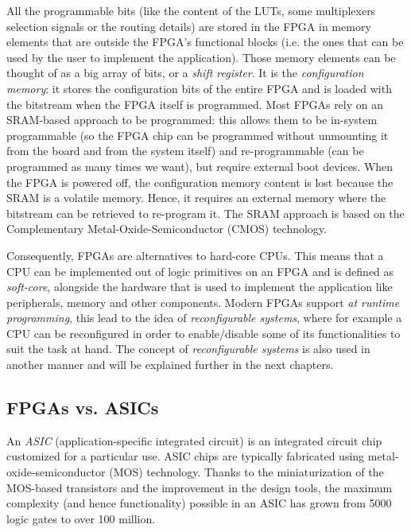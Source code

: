 All the programmable bits (like the content of the LUTs, some multiplexers selection signals or the routing details) are stored in the FPGA in memory elements that are outside the FPGA's functional blocks (i.e. the ones that can be used by the user to implement the application). Those memory elements can be thought of as a big array of bits, or a \textit{shift register}. It is the \textit{configuration memory}: it stores the configuration bits of the entire FPGA and is loaded with the bitstream when the FPGA itself is programmed. Most FPGAs rely on an SRAM-based approach to be programmed: this allows them to be in-system programmable (so the FPGA chip can be programmed without unmounting it from the board and from the system itself) and re-programmable (can be programmed as many times we want), but require external boot devices. When the FPGA is powered off, the configuration memory content is lost because the SRAM is a volatile memory. Hence, it requires an external memory where the bitstream can be retrieved to re-program it. The SRAM approach is based on the Complementary Metal-Oxide-Semiconductor (CMOS) technology.\bigskip

Consequently, FPGAs are alternatives to hard-core CPUs. This means that a CPU can be implemented out of logic primitives on an FPGA and is defined as \textit{soft-core}, alongside the hardware that is used to implement the application like peripherals, memory and other components. Modern FPGAs support \textit{at runtime programming}, this lead to the idea of \textit{reconfigurable systems}, where for example a CPU can be reconfigured in order to enable/disable some of its functionalities to suit the task at hand. The concept of \textit{reconfigurable systems} is also used in another manner and will be explained further in the next chapters.

\subsection{FPGAs vs. ASICs}

An \textit{ASIC} (application-specific integrated circuit) is an integrated circuit chip customized for a particular use. ASIC chips are typically fabricated using metal-oxide-semiconductor (MOS) technology. Thanks to the miniaturization of the MOS-based transistors and the improvement in the design tools, the maximum complexity (and hence functionality) possible in an ASIC has grown from 5000 logic gates to over 100 million. \bigskip

